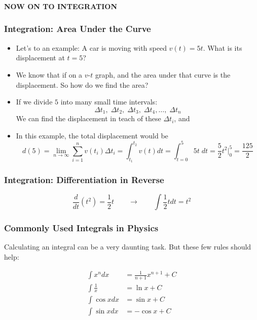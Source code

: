 \documentclass[12pt,compress,aspectratio=169]{beamer}
\begin{document}
\begin{frame}
  \frametitle{}
  \begin{center}
    {\LARGE\textbf{NOW ON TO INTEGRATION}}
  \end{center}
\end{frame}

\begin{frame}
  \frametitle{Integration: Area Under the Curve}

  \begin{itemize}
  \item Let's to an example: A car is moving with speed $v(t)=5t$. What is its
    displacement at $t=5$?
  \item We know that if on a $v$-$t$ graph, and the area under that curve is
    the displacement. So how do we find the area?
  \item If we divide $5$ into many small time intervals:
    \begin{displaymath}
      \Delta t_1,\;\Delta t_2,\;\Delta t_3,\;\Delta t_4,\ldots,\;\Delta t_n
    \end{displaymath}
    We can find the displacement in teach of these $\Delta t_i$, and
  \item In this example, the total displacement would be  
    \begin{displaymath}
      d(5)=\lim_{n\rightarrow\infty}\sum_{i=1}^{n}v(t_i)\Delta t_i=\int_{t_1}^{t_2}v(t)dt=
      \int_{t=0}^{5}5t\;dt=\frac{5}{2}t^2\Big|^5_0=\frac{125}{2}
    \end{displaymath}
  \end{itemize}
\end{frame}

\begin{frame}
  \frametitle{Integration: Differentiation in Reverse}
  \begin{displaymath}
    \frac{d}{dt}\left(t^2\right)=\frac{1}{2}t
    \quad\quad\longrightarrow\quad\quad
    \int\frac{1}{2}tdt=t^2
  \end{displaymath}
\end{frame}

\begin{frame}
  \frametitle{Commonly Used Integrals in Physics}
  Calculating an integral can be a very daunting task. But these few rules
  should help:

  \begin{align*}
    \int x^ndx&=\frac{1}{n+1}x^{n+1}+C\\
    \int \frac{1}{x}&=\ln x+C\\
    \int\cos xdx&=\sin x+C\\
    \int\sin xdx&=-\cos x+C
  \end{align*}
\end{frame}
\end{document}
